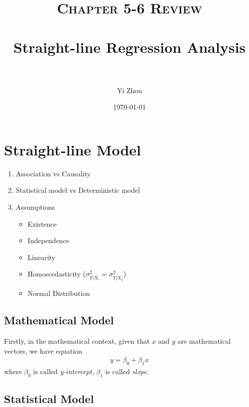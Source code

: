 \documentclass[paper=a4, fontsize=11pt]{scrartcl} %
\title{	
\normalfont \normalsize 
\textsc{Chapter 5-6 Review} \\ [25pt] %
\horrule{0.5pt} \\[0.4cm] %
\huge Straight-line Regression Analysis \\ %
\horrule{2pt} \\[0.5cm] %
}
\author{Yi Zhou} %
\date{\normalsize\today} %
\numberwithin{equation}{section} %
\numberwithin{figure}{section} %
\numberwithin{table}{section} %
\begin{document}
\maketitle %


\section{Straight-line Model}

\begin{enumerate}
\item Association vs Causality
\item Statistical model vs Deterministic model
\item Assumptions

 \begin{itemize}
	\item Existence
	\item Independence
	\item Linearity
	\item Homoscedasticity ($\sigma_{Y|X_i}^2=\sigma_{Y|X_j}^2$)
	\item Normal Distribution
\end{itemize}

\end{enumerate}



\subsection{Mathematical Model}

Firstly, in the mathematical context, given that $x$ and $y$ are mathematical vectors, we have equation
\begin{align}
y = \beta_0 + \beta_1x
\end{align}
where $\beta_0$ is called \textit{y-intercept}, $\beta_1$ is called \textit{slope}.


\subsection{Statistical Model}
\end{document}
